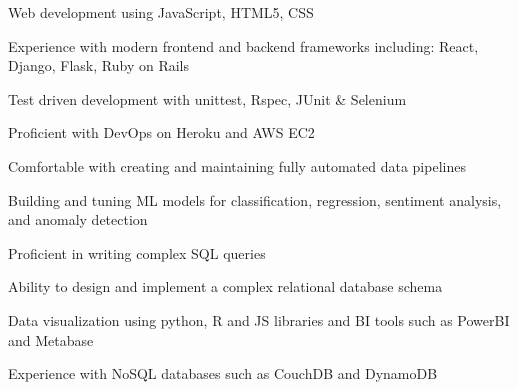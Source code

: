 




\begin{cvparagraph}

      \begin{cvitems}
        \item Web development using JavaScript, HTML5, CSS
        \item Experience with modern frontend and backend frameworks including: React, Django, Flask, Ruby on Rails
        \item Test driven development with unittest, Rspec, JUnit \& Selenium
        \item Proficient with DevOps on Heroku and AWS EC2
      \end{cvitems}

\end{cvparagraph}




\begin{cvparagraph}

      \begin{cvitems}
        \item Comfortable with creating and maintaining fully automated data pipelines
        \item Building and tuning ML models for classification, regression, sentiment analysis, and anomaly detection
        \item Proficient in writing complex SQL queries
        \item Ability to design and implement a complex relational database schema
        \item Data visualization using python, R and JS libraries and BI tools such as PowerBI and Metabase
        \item Experience with NoSQL databases such as CouchDB and DynamoDB
      \end{cvitems}

\end{cvparagraph}


